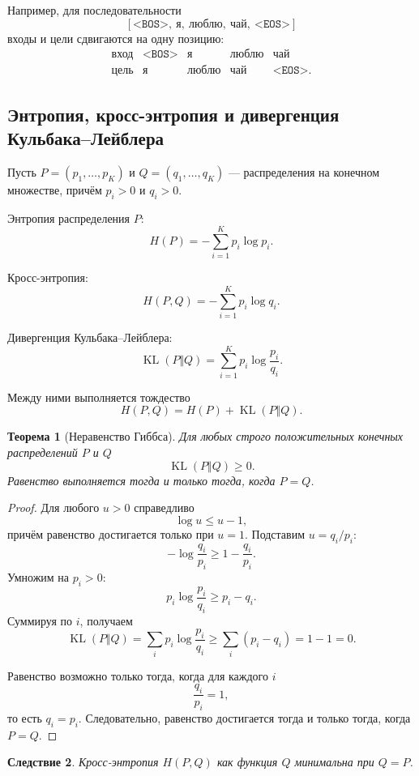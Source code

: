 \documentclass[12pt,a4paper]{article}
\DeclareMathOperator{\KL}{KL}
\newcommand{\1}{\mathbf{1}}
\newtheorem{theorem}{Теорема}[section]
\newtheorem{corollary}[theorem]{Следствие}
\theoremstyle{definition}
\theoremstyle{remark}
\begin{document}
Например, для последовательности
\[
[\texttt{<BOS>},\ \texttt{я},\ \texttt{люблю},\
 \texttt{чай},\ \texttt{<EOS>}]
\]
входы и цели сдвигаются на одну позицию:
\[
\begin{array}{c|cccc}
\text{вход} &
\texttt{<BOS>} & \texttt{я} & \texttt{люблю} & \texttt{чай}
\\
\hline
\text{цель} &
\texttt{я} & \texttt{люблю} & \texttt{чай} & \texttt{<EOS>}.
\end{array}
\]

\subsection{Энтропия, кросс-энтропия и дивергенция Кульбака--Лейблера}

Пусть $P=(p_1,\ldots,p_K)$ и $Q=(q_1,\ldots,q_K)$ --- распределения на
конечном множестве, причём $p_i>0$ и $q_i>0$.

Энтропия распределения $P$:
\[
H(P)=-\sum_{i=1}^{K}p_i\log p_i.
\]

Кросс-энтропия:
\[
H(P,Q)=-\sum_{i=1}^{K}p_i\log q_i.
\]

Дивергенция Кульбака--Лейблера:
\[
\KL(P\Vert Q)
=
\sum_{i=1}^{K}p_i\log\frac{p_i}{q_i}.
\]

Между ними выполняется тождество
\[
H(P,Q)=H(P)+\KL(P\Vert Q).
\]

\begin{theorem}[Неравенство Гиббса]
Для любых строго положительных конечных распределений $P$ и $Q$
\[
\KL(P\Vert Q)\geq 0.
\]
Равенство выполняется тогда и только тогда, когда $P=Q$.
\end{theorem}

\begin{proof}
Для любого $u>0$ справедливо
\[
\log u\leq u-1,
\]
причём равенство достигается только при $u=1$. Подставим
$u=q_i/p_i$:
\[
-\log\frac{q_i}{p_i}
\geq
1-\frac{q_i}{p_i}.
\]
Умножим на $p_i>0$:
\[
p_i\log\frac{p_i}{q_i}\geq p_i-q_i.
\]
Суммируя по $i$, получаем
\[
\KL(P\Vert Q)
=
\sum_i p_i\log\frac{p_i}{q_i}
\geq
\sum_i(p_i-q_i)=1-1=0.
\]

Равенство возможно только тогда, когда для каждого $i$
\[
\frac{q_i}{p_i}=1,
\]
то есть $q_i=p_i$. Следовательно, равенство достигается тогда и только
тогда, когда $P=Q$.
\end{proof}

\begin{corollary}
Кросс-энтропия $H(P,Q)$ как функция $Q$ минимальна при $Q=P$.
\end{corollary}
\end{document}
